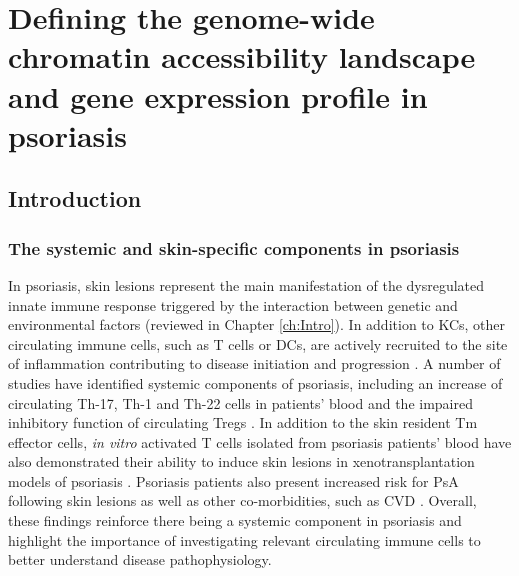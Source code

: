 \chapter{Defining the genome-wide chromatin accessibility landscape and gene expression profile in psoriasis}
\label{ch:Results 2}


\section{Introduction}

\subsection{The systemic and skin-specific components in psoriasis}
In psoriasis, skin lesions represent the main manifestation of the dysregulated innate immune response triggered by the interaction between genetic and environmental factors (reviewed in Chapter \ref{ch:Intro}). In addition to KCs, other circulating immune cells, such as T cells or DCs, are actively recruited to the site of inflammation contributing to disease initiation and progression \parencite{Leanne2012}. A number of studies have identified systemic components of psoriasis, including an increase of circulating Th-17, Th-1 and Th-22 cells in patients' blood and the impaired inhibitory function of circulating Tregs \parencite{Kagami2010,Sugiyama2005}. In addition to the skin resident Tm effector cells, \textit{in vitro} activated T cells isolated from psoriasis patients' blood have also demonstrated their ability to induce skin lesions in xenotransplantation models of psoriasis \parencite{Wrone-Smith1996,Nickoloff1999}. Psoriasis patients also present increased risk for PsA following skin lesions as well as other co-morbidities, such as CVD \parencite{Ibrahim2009,Shapiro2007}. Overall, these findings reinforce there being a systemic component in psoriasis and highlight the importance of investigating relevant circulating immune cells to better understand disease pathophysiology.




